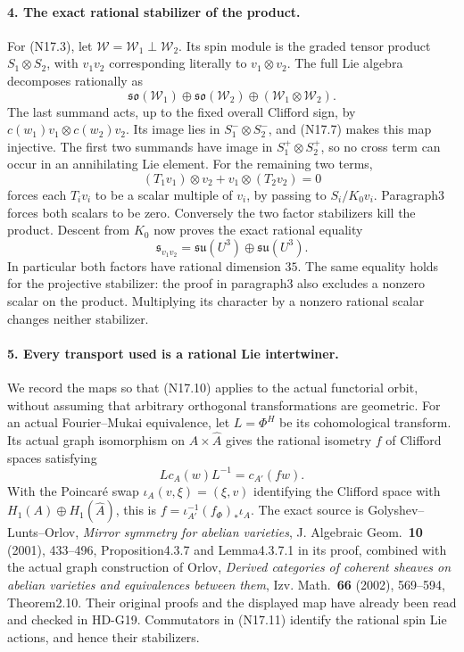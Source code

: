 \paragraph{4. The exact rational stabilizer of the product.}
For (N17.3), let $\mathcal W=\mathcal W_1\perp\mathcal W_2$.
Its spin module is the graded tensor product $S_1\otimes S_2$,
with $v_1v_2$ corresponding literally to $v_1\otimes v_2$.
The full Lie algebra decomposes rationally as
\[
 \mathfrak{so}(\mathcal W_1)\oplus
 \mathfrak{so}(\mathcal W_2)\oplus
                         (\mathcal W_1\otimes\mathcal W_2).
\]
The last summand acts, up to the fixed overall Clifford sign,
by $c(w_1)v_1\otimes c(w_2)v_2$. Its image lies in
$S_1^-\otimes S_2^-$, and (N17.7) makes this map injective.
The first two summands have image in $S_1^+\otimes S_2^+$,
so no cross term can occur in an annihilating Lie element.
For the remaining two terms,
\[
 (T_1v_1)\otimes v_2+v_1\otimes(T_2v_2)=0
\]
forces each $T_iv_i$ to be a scalar multiple of $v_i$, by
passing to $S_i/K_0v_i$. Paragraph3 forces both scalars to
be zero. Conversely the two factor stabilizers kill the
product. Descent from $K_0$ now proves the exact rational
equality
\begin{equation}
 \boxed{\ \mathfrak s_{v_1v_2}
          =\mathfrak{su}(U^3)\oplus\mathfrak{su}(U^3).\ } \tag{N17.10}
\end{equation}
In particular both factors have rational dimension $35$.
The same equality holds for the projective stabilizer:
the proof in paragraph3 also excludes a nonzero scalar
on the product. Multiplying its character by a nonzero
rational scalar changes neither stabilizer.

\paragraph{5. Every transport used is a rational Lie intertwiner.}
We record the maps so that (N17.10) applies to the actual
functorial orbit, without assuming that arbitrary orthogonal
transformations are geometric. For an actual Fourier--Mukai
equivalence, let $L=\Phi^H$ be its cohomological transform.
Its actual graph isomorphism on $A\times\widehat A$ gives
the rational isometry $f$ of Clifford spaces satisfying
\begin{equation}
            Lc_A(w)L^{-1}=c_{A'}(fw).                \tag{N17.11}
\end{equation}
With the Poincar\'e swap
$\iota_A(v,\xi)=(\xi,v)$ identifying the Clifford space
with $H_1(A)\oplus H_1(\widehat A)$, this is
$f=\iota_{A'}^{-1}(f_\Phi)_*\iota_A$.
The exact source is Golyshev--Lunts--Orlov,
\emph{Mirror symmetry for abelian varieties},
J. Algebraic Geom.\ \textbf{10} (2001), 433--496,
Proposition4.3.7 and Lemma4.3.7.1 in its proof, combined
with the actual graph construction of Orlov,
\emph{Derived categories of coherent sheaves on abelian varieties
and equivalences between them}, Izv. Math.\ \textbf{66} (2002),
569--594, Theorem2.10. Their original proofs and the displayed
map have already been read and checked in HD-G19.
Commutators in (N17.11) identify the rational spin Lie
actions, and hence their stabilizers.

